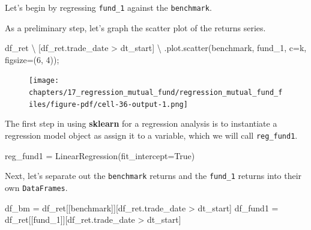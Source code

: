 \documentclass[
  letterpaper,
  DIV=11,
  numbers=noendperiod]{scrreprt}
\newenvironment{Shaded}{\begin{snugshade}}{\end{snugshade}}
\newcommand{\DecValTok}[1]{\textcolor[rgb]{0.68,0.00,0.00}{#1}}
\newcommand{\NormalTok}[1]{\textcolor[rgb]{0.00,0.23,0.31}{#1}}
\newcommand{\OperatorTok}[1]{\textcolor[rgb]{0.37,0.37,0.37}{#1}}
\newcommand{\StringTok}[1]{\textcolor[rgb]{0.13,0.47,0.30}{#1}}
\newcommand{\VariableTok}[1]{\textcolor[rgb]{0.07,0.07,0.07}{#1}}
\begin{document}
Let's begin by regressing \texttt{fund\_1} against the
\texttt{benchmark}.

As a preliminary step, let's graph the scatter plot of the returns
series.

\begin{Shaded}
\begin{Highlighting}[]
\NormalTok{df\_ret }\OperatorTok{\textbackslash{}}
\NormalTok{    [df\_ret.trade\_date }\OperatorTok{\textgreater{}}\NormalTok{ dt\_start] }\OperatorTok{\textbackslash{}}
\NormalTok{    .plot.scatter(}\StringTok{\textquotesingle{}benchmark\textquotesingle{}}\NormalTok{, }\StringTok{\textquotesingle{}fund\_1\textquotesingle{}}\NormalTok{, c}\OperatorTok{=}\StringTok{\textquotesingle{}k\textquotesingle{}}\NormalTok{, figsize}\OperatorTok{=}\NormalTok{(}\DecValTok{6}\NormalTok{, }\DecValTok{4}\NormalTok{))}\OperatorTok{;}
\end{Highlighting}
\end{Shaded}

\begin{figure}[H]

{\centering \texttt{[image: chapters/17\_regression\_mutual\_fund/regression\_mutual\_fund\_files/figure-pdf/cell-36-output-1.png]}

}

\end{figure}

The first step in using \textbf{sklearn} for a regression analysis is to
instantiate a regression model object as assign it to a variable, which
we will call \texttt{reg\_fund1}.

\begin{Shaded}
\begin{Highlighting}[]
\NormalTok{reg\_fund1 }\OperatorTok{=}\NormalTok{ LinearRegression(fit\_intercept}\OperatorTok{=}\VariableTok{True}\NormalTok{)}
\end{Highlighting}
\end{Shaded}

Next, let's separate out the \texttt{benchmark} returns and the
\texttt{fund\_1} returns into their own \texttt{DataFrames}.

\begin{Shaded}
\begin{Highlighting}[]
\NormalTok{df\_bm }\OperatorTok{=}\NormalTok{ df\_ret[[}\StringTok{\textquotesingle{}benchmark\textquotesingle{}}\NormalTok{]][df\_ret.trade\_date }\OperatorTok{\textgreater{}}\NormalTok{ dt\_start]}
\NormalTok{df\_fund1 }\OperatorTok{=}\NormalTok{ df\_ret[[}\StringTok{\textquotesingle{}fund\_1\textquotesingle{}}\NormalTok{]][df\_ret.trade\_date }\OperatorTok{\textgreater{}}\NormalTok{ dt\_start]}
\end{Highlighting}
\end{Shaded}
\end{document}
